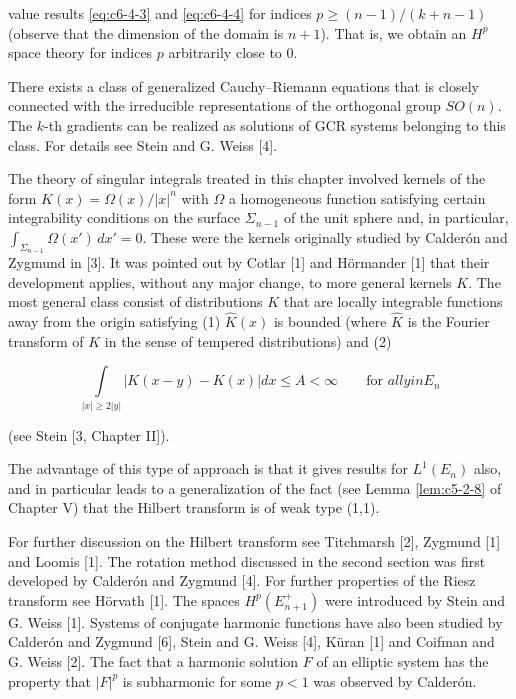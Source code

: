 value results \eqref{eq:c6-4-3} and \eqref{eq:c6-4-4} for indices $p \geq (n - 1)/(k + n - 1)$ (observe that the dimension of the domain is $n + 1$). That is, we obtain an $H^p$ space theory for indices $p$ arbitrarily close to 0.

There exists a class of generalized Cauchy--Riemann equations that is closely connected with the irreducible representations of the orthogonal group $SO(n)$. The $k$-th gradients can be realized as solutions of GCR systems belonging to this class. For details see Stein and G. Weiss [4].

 The theory of singular integrals treated in this chapter involved kernels of the form $K(x) = \Omega(x)/|x|^n$ with $\Omega$ a homogeneous function satisfying certain integrability conditions on the surface $\Sigma_{n-1}$ of the unit sphere and, in particular, $\int_{\Sigma_{n-1}} \Omega(x') \, dx' = 0$. These were the kernels originally studied by Calderón and Zygmund in [3]. It was pointed out by Cotlar [1] and Hörmander [1] that their development applies, without any major change, to more general kernels $K$. The most general class consist of distributions $K$ that are locally integrable functions away from the origin satisfying (1) $\hat{K}(x)$ is bounded (where $\hat{K}$ is the Fourier transform of $K$ in the sense of tempered distributions) and (2)

\[
\int\limits_{|x|\geq2|y|}\left|K(x-y)-K(x)\right|dx\le A<\infty\qquad \text{for } all y in E_{n}
\]

(see Stein [3, Chapter II]).

The advantage of this type of approach is that it gives results for $L^{1}(E_{n})$ also, and in particular leads to a generalization of the fact (see Lemma \ref{lem:c5-2-8} of Chapter V) that the Hilbert transform is of weak type (1,1).

\bibnoteshead

For further discussion on the Hilbert transform see Titchmarsh [2], Zygmund [1] and Loomis [1]. The rotation method discussed in the second section was first developed by Calderón and Zygmund [4]. For further properties of the Riesz transform see Hörvath [1]. The spaces $H^{p}(E_{n+1}^{+})$ were introduced by Stein and G. Weiss [1]. Systems of conjugate harmonic functions have also been studied by Calderón and Zygmund [6], Stein and G. Weiss [4], Küran [1] and Coifman and G. Weiss [2]. The fact that a harmonic solution $F$ of an elliptic system has the property that $|F|^{p}$ is subharmonic for some $p < 1$ was observed by Calderón.


